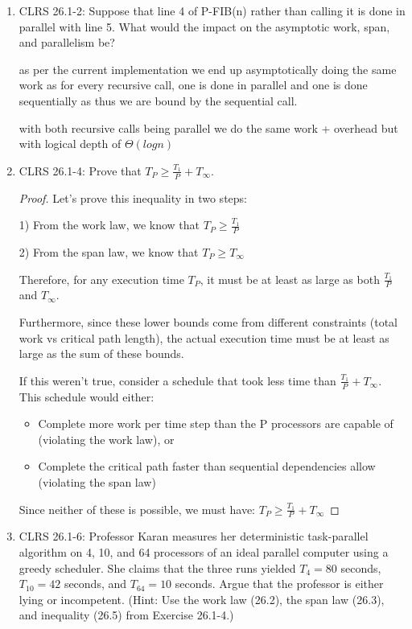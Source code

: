 \documentclass{article}
\theoremstyle{definition}
\begin{document}
\begin{enumerate}
    \item CLRS 26.1-2: Suppose that line 4 of P-FIB(n) rather than calling it is done in parallel with line 5. What would the impact on the asymptotic work, span, and parallelism be?
    
   as per the current implementation we end up asymptotically doing the same work as for every recursive call, one is done in parallel and one is done sequentially as thus we are bound by the sequential call.

   with both recursive calls being parallel we do the same work + overhead but with logical depth of $\Theta(log n)$


    \item CLRS 26.1-4: Prove that $T_P \geq \frac{T_1}{P} + T_{\infty}$.
    
    \begin{proof}
    Let's prove this inequality in two steps:
    
    1) From the work law, we know that $T_P \geq \frac{T_1}{P}$
    
    2) From the span law, we know that $T_P \geq T_{\infty}$
    
    Therefore, for any execution time $T_P$, it must be at least as large as both $\frac{T_1}{P}$ and $T_{\infty}$.
    
    Furthermore, since these lower bounds come from different constraints (total work vs critical path length), 
    the actual execution time must be at least as large as the sum of these bounds.
    
    If this weren't true, consider a schedule that took less time than $\frac{T_1}{P} + T_{\infty}$. 
    This schedule would either:
    \begin{itemize}
        \item Complete more work per time step than the P processors are capable of (violating the work law), or
        \item Complete the critical path faster than sequential dependencies allow (violating the span law)
    \end{itemize}
    
    Since neither of these is possible, we must have:
    $T_P \geq \frac{T_1}{P} + T_{\infty}$
    \end{proof}
    
    \item CLRS 26.1-6: Professor Karan measures her deterministic task-parallel algorithm on 4, 10, and 64 processors of an ideal parallel computer using a greedy scheduler. She claims that the three runs yielded $T_4 = 80$ seconds, $T_{10} = 42$ seconds, and $T_{64} = 10$ seconds. Argue that the professor is either lying or incompetent. (Hint: Use the work law (26.2), the span law (26.3), and inequality (26.5) from Exercise 26.1-4.)
    

\end{enumerate}
\end{document}
